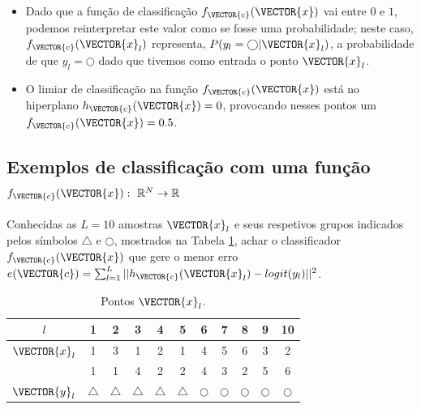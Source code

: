 \begin{tcbattention}
\begin{itemize}
\item Dado que a função de classificação $f_{\VECTOR{c}}(\VECTOR{x})$ vai entre $0$ e $1$,
podemos reinterpretar este valor como se fosse uma probabilidade;
neste caso, $f_{\VECTOR{c}}(\VECTOR{x}_l)$ representa, $P(y_l=\bigcirc|\VECTOR{x}_l)$, 
a probabilidade de que $y_l=\bigcirc$ dado que tivemos como entrada o ponto $\VECTOR{x}_l$.
\item O limiar de classificação na função $f_{\VECTOR{c}}(\VECTOR{x})$ está no hiperplano $h_{\VECTOR{c}}(\VECTOR{x})=0$,
provocando nesses pontos um $f_{\VECTOR{c}}(\VECTOR{x})=0.5$.
\end{itemize}
\end{tcbattention}



\subsection{Exemplos de classificação com uma função
$f_{\VECTOR{c}}(\VECTOR{x}):~\mathbb{R}^N \rightarrow \mathbb{R}$ }

\begin{example}\label{ex:theo:reglogrnr1}
Conhecidas as $L=10$ amostras $\VECTOR{x}_l$ e seus respetivos grupos indicados pelos símbolos $\bigtriangleup$ e $\bigcirc$, 
mostrados na Tabela \ref{table:theo:reglogrnr1:xn},
achar o classificador $f_{\VECTOR{c}}(\VECTOR{x})$ 
que gere o menor erro $e(\VECTOR{c}) =  \sum_{l=1}^{L} ||h_{\VECTOR{c}}(\VECTOR{x}_l)-logit(y_l)||^2$.
\end{example}


\begin{table}[h!]
\centering
\begin{tabular}{|c||c|c|c|c|c||c|c|c|c|c||} 
 \hline
$l$            & 1 & 2 & 3 & 4 & 5 & 6 & 7 & 8 & 9 & 10 \\ \hline \hline
$\VECTOR{x}_l$ & 1 & 3 & 1 & 2 & 1 & 4 & 5 & 6 & 3 & 2 \\ 
~              & 1 & 1 & 4 & 2 & 2 & 4 & 3 & 2 & 5 & 6 \\ \hline
$\VECTOR{y}_l$ & $\bigtriangleup$ & $\bigtriangleup$ & $\bigtriangleup$ & $\bigtriangleup$ & $\bigtriangleup$ 
      & $\bigcirc$ & $\bigcirc$ & $\bigcirc$ & $\bigcirc$ & $\bigcirc$\\ \hline
\end{tabular}
\caption{Pontos $\VECTOR{x}_l$.}
\label{table:theo:reglogrnr1:xn}
\end{table}


